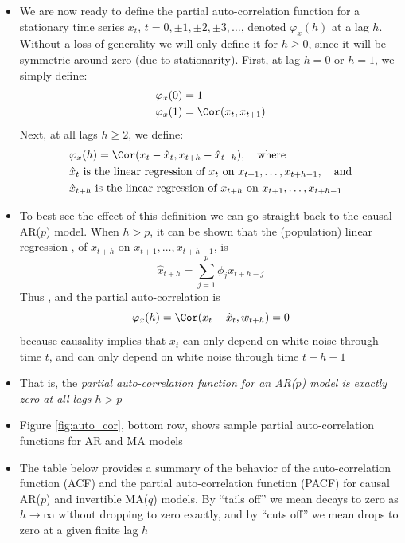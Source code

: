 \documentclass{article}
\begin{document}
\begin{itemize}
\item We are now ready to define the partial auto-correlation function for a
  stationary time series $x_t$, $t = 0, \pm 1, \pm 2, \pm 3, \dots$, denoted
  $\varphi_x(h)$ at a lag $h$. Without a loss of generality we will only define 
  it for $h \geq 0$, since it will be symmetric around zero (due to
  stationarity). First, at lag $h=0$ or $h=1$, we simply define:   
  \begin{align*}
  \varphi_x(0) &= 1 \\
  \varphi_x(1) &= \Cor(x_t, x_{t+1}) 
  \end{align*}
  Next, at all lags $h \geq 2$, we define: 
  \begin{align*}
  &\varphi_x(h) = \Cor(x_t - \hat{x}_t, x_{t+h} - \hat{x}_{t+h}), \quad
    \text{where} \\ 
  &\text{$\hat{x}_t$ is the linear regression of $x_t$ on
    $x_{t+1},\dots,x_{t+h-1}$}, \quad \text{and} \\ 
  &\text{$\hat{x}_{t+h}$ is the linear regression of $x_{t+h}$ on 
    $x_{t+1},\dots,x_{t+h-1}$}  
  \end{align*}

\item To best see the effect of this definition we can go straight back to the
  causal AR($p$) model. When $h>p$, it can be shown that the (population) linear  
  regression , of $x_{t+h}$ on $x_{t+1},\dots,x_{t+h-1}$, 
  is 
  \[
  \hat{x}_{t+h} = \sum_{j=1}^p \phi_j x_{t+h-j}
  \]
  Thus , and the partial auto-correlation is
  \[
  \varphi_x(h) = \Cor(x_t - \hat{x}_t, w_{t+h}) = 0
  \]
  because causality implies that $x_t$ can only depend on white noise through
  time $t$, and  can only depend on white noise through time
  $t+h-1$ 

\item That is, the \emph{partial auto-correlation function for an AR($p$) model
  is exactly zero at all lags $h > p$}

\item Figure \ref{fig:auto_cor}, bottom row, shows sample partial
  auto-correlation functions for AR and MA models

\item The table below provides a summary of the behavior of the auto-correlation 
  function (ACF) and the partial auto-correlation function (PACF) for causal
  AR($p$) and invertible MA($q$) models. By ``tails off'' we mean decays to zero
  as $h \to \infty$ without dropping to zero exactly, and by ``cuts off'' we
  mean drops to zero at a given finite lag $h$


\end{itemize}
\end{document}
